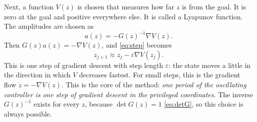 Next, a function $V(z)$ is chosen that measures how far $z$ is from the goal. It
is zero at the goal and positive everywhere else. It is called a Lyapunov
function. The amplitudes are chosen as
\begin{equation}
  a(z)=-G(z)^{-1}\nabla V(z).
  \label{eq:agradient}
\end{equation}
Then $G(z)a(z)=-\nabla V(z)$, and \eqref{eq:step} becomes
\begin{equation}
  z_{j+1}\approx z_j-\varepsilon\nabla V(z_j).
\end{equation}
This is one step of gradient descent with step length $\varepsilon$: the state
moves a little in the direction in which $V$ decreases fastest. For small steps,
this is the gradient flow $\dot z=-\nabla V(z)$. This is the core of the method:
\emph{one period of the oscillating controller is one step of gradient descent
in the privileged coordinates.} The inverse $G(z)^{-1}$ exists for every $z$,
because $\det G(z)=1$ \eqref{eq:detG}, so this choice is always possible.

